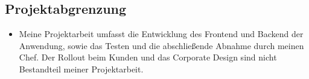 \subsection{Projektabgrenzung} 
\label{sec:Projektabgrenzung}
\begin{itemize}
	\item Meine Projektarbeit umfasst die Entwicklung des Frontend und Backend der Anwendung, sowie das Testen und die abschließende Abnahme durch meinen Chef. Der Rollout beim Kunden und das Corporate Design sind nicht Bestandteil meiner Projektarbeit.
\end{itemize}
